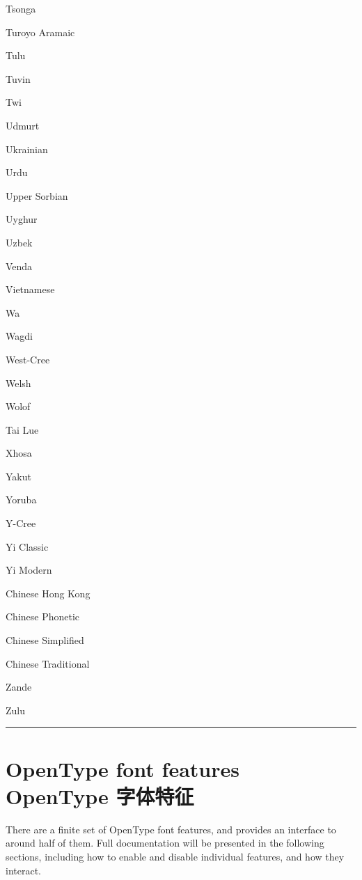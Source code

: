 \documentclass[a4paper]{l3doc}
\begin{document}
\begin{table}[p]
\begin{minipage}{\linewidth+4cm}
\begin{multicols}{6}
    Tsonga \par
    Turoyo Aramaic \par
    Tulu \par
    Tuvin \par
    Twi \par
    Udmurt \par
    Ukrainian \par
    Urdu \par
    Upper Sorbian \par
    Uyghur \par
    Uzbek \par
    Venda \par
    Vietnamese \par
    Wa \par
    Wagdi \par
    West-Cree \par
    Welsh \par
    Wolof \par
    Tai Lue \par
    Xhosa \par
    Yakut \par
    Yoruba \par
    Y-Cree \par
    Yi Classic \par
    Yi Modern \par
    Chinese Hong Kong \par
    Chinese Phonetic \par
    Chinese Simplified \par
    Chinese Traditional \par
    Zande \par
    Zulu
  \end{multicols}
  \hspace{4pt}
  \hrule
 \end{minipage}
\end{table}


\section{OpenType font features\\OpenType 字体特征}
\label{sec:ot-feat}

There are a finite set of OpenType font features, and  provides an
interface to around half of them.
Full documentation will be presented in the following sections, including how to
enable and disable individual features, and how they interact.
\end{document}
